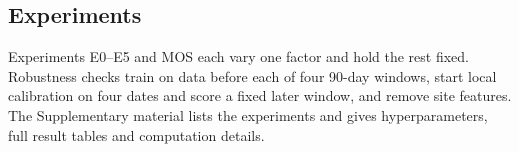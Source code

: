 \subsection{Experiments}
\label{sec:meth-exp}

Experiments E0--E5 and MOS each vary one factor and hold the rest fixed. Robustness checks train on data before each of four 90-day windows, start local calibration on four dates and score a fixed later window, and remove site features. The Supplementary material lists the experiments and gives hyperparameters, full result tables and computation details.
